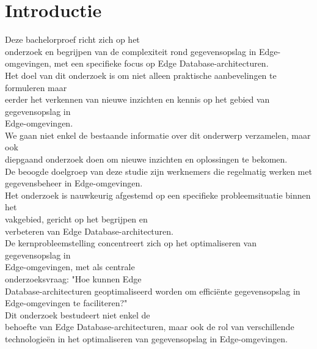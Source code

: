
\section{Introductie}%
\label{sec:introductie}

Deze bachelorproef richt zich op het \\ onderzoek en begrijpen van de complexiteit rond gegevensopslag in Edge-omgevingen,
 met een specifieke focus op Edge Database-architecturen. \\
 
Het doel van dit onderzoek is om niet alleen praktische aanbevelingen te formuleren maar \\ eerder het verkennen van
nieuwe inzichten en kennis op het gebied van gegevensopslag in \\ Edge-omgevingen. \\

We gaan niet enkel de bestaande informatie over dit onderwerp verzamelen, maar ook \\ diepgaand onderzoek doen
 om nieuwe inzichten en oplossingen te bekomen. \\

De beoogde doelgroep van deze studie zijn werknemers die regelmatig werken met \\ gegevensbeheer in Edge-omgevingen. \\

Het onderzoek is nauwkeurig afgestemd op een specifieke probleemsituatie binnen het \\ vakgebied,
 gericht op het begrijpen en \\ verbeteren van Edge Database-architecturen. \\

De kernprobleemstelling concentreert zich op het optimaliseren van gegevensopslag in \\ Edge-omgevingen,
 met als centrale \\ onderzoeksvraag: 
 "Hoe kunnen Edge \\ Database-architecturen geoptimaliseerd worden om efficiënte gegevensopslag in Edge-omgevingen te faciliteren?" \\

Dit onderzoek bestudeert niet
enkel de \\ behoefte van Edge Database-architecturen,
maar ook de rol van verschillende technologieën
  in het optimaliseren van gegevensopslag in Edge-omgevingen. \\ \\


